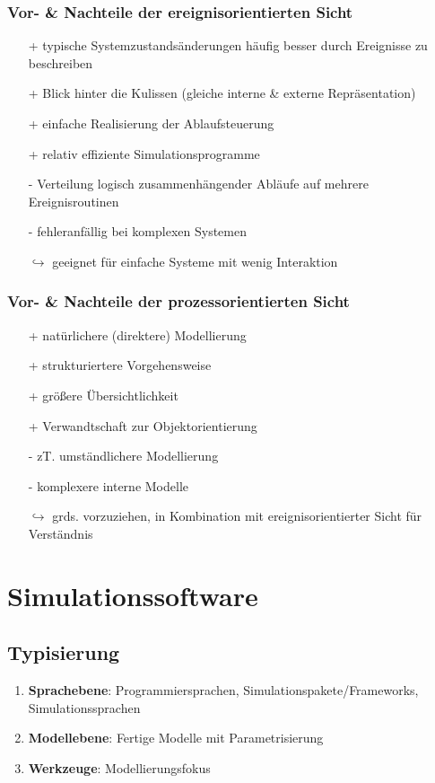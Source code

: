 \documentclass{article}
\begin{document}
\subsubsection{Vor- \& Nachteile der ereignisorientierten Sicht}
\begin{itemize}
  \item[+] typische Systemzustandsänderungen häufig besser durch Ereignisse zu beschreiben
  \item[+] Blick hinter die Kulissen (gleiche interne \& externe Repräsentation)
  \item[+] einfache Realisierung der Ablaufsteuerung
  \item[+] relativ effiziente Simulationsprogramme
  \item[-] Verteilung logisch zusammenhängender Abläufe auf mehrere Ereignisroutinen
  \item[-] fehleranfällig bei komplexen Systemen
  \item[$\hookrightarrow$] geeignet für einfache Systeme mit wenig Interaktion
\end{itemize}

\subsubsection{Vor- \& Nachteile der prozessorientierten Sicht}
\begin{itemize}
  \item[+] natürlichere (direktere) Modellierung
  \item[+] strukturiertere Vorgehensweise
  \item[+] größere Übersichtlichkeit
  \item[+] Verwandtschaft zur Objektorientierung
  \item[-] zT. umständlichere Modellierung
  \item[-] komplexere interne Modelle
  \item[$\hookrightarrow$] grds. vorzuziehen, in Kombination mit ereignisorientierter Sicht für Verständnis
\end{itemize}

\section{Simulationssoftware}

\subsection{Typisierung}
\begin{enumerate}
  \item \textbf{Sprachebene}: Programmiersprachen, Simulationspakete/Frameworks, Simulationssprachen
  \item \textbf{Modellebene}: Fertige Modelle mit Parametrisierung
  \item \textbf{Werkzeuge}: Modellierungsfokus
\end{enumerate}
\end{document}

